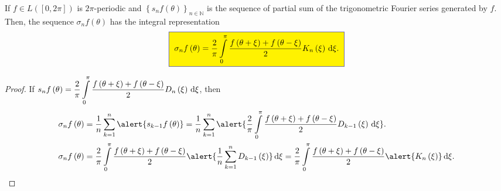 \begin{frame}
	\frametitle{\secname}

	\begin{lemma}
		If $f\in L\left(\left[0,2\pi\right]\right)$ is $2\pi$-periodic
		and $\left\{s_{n}f\left(\theta\right)\right\}_{n\in\mathds{N}}$
		is the sequence of partial sum of the trigonometric Fourier
		series generated by $f$.
		Then, the sequence
		\begin{math}
			\sigma_{n}
			f\left(\theta\right)
		\end{math}
		has the integral representation
		\begin{equation*}
			\fcolorbox{DarkBlue}{yellow}{
				\begin{math}
					\displaystyle
					\sigma_{n}f\left(\theta\right)=
					\frac{2}{\pi}
					\int\limits_{0}^{\pi}
					\frac{f\left(\theta+\xi\right)+f\left(\theta-\xi\right)}{2}
					K_{n}\left(\xi\right)\dl\xi.
				\end{math}
			}
		\end{equation*}
	\end{lemma}

	\begin{proof}
		If
		\begin{math}
			s_{n}f\left(\theta\right)=
			\displaystyle
			\frac{2}{\pi}
			\int\limits_{0}^{\pi}
			\frac{f\left(\theta+\xi\right)+f\left(\theta-\xi\right)}{2}
			D_{n}\left(\xi\right)\dl\xi
		\end{math},
		then
		\begin{align*}
			\sigma_{n}f\left(\theta\right)
			 & =
			\dfrac{1}{n}
			\sum\limits_{k=1}^{n}
			\alert{s_{k-1}f\left(\theta\right)}
			= \frac{1}{n}
			\sum\limits_{k=1}^{n}
			\alert{
				\frac{2}{\pi}
				\int\limits_{0}^{\pi}
				\frac{f\left(\theta+\xi\right)+f\left(\theta-\xi\right)}{2}
				D_{k-1}\left(\xi\right)\dl\xi
			}.   \\
			\sigma_{n}f\left(\theta\right)
			 & =
			\frac{2}{\pi}
			\int\limits_{0}^{\pi}
			\frac{f\left(\theta+\xi\right)+f\left(\theta-\xi\right)}{2}
			\alert{
				\frac{1}{n}\sum\limits_{k=1}^{n}
				D_{k-1}\left(\xi\right)
			}
			\dl\xi
			=
			\frac{2}{\pi}
			\int\limits_{0}^{\pi}
			\frac{f\left(\theta+\xi\right)+f\left(\theta-\xi\right)}{2}
			\alert{K_{n}\left(\xi\right)}
			\dl\xi.
		\end{align*}
	\end{proof}
\end{frame}

